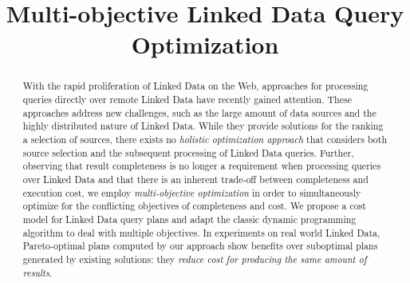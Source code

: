 \documentclass{sig-alternate}
\title{Multi-objective Linked Data Query Optimization}
\author{
}
\begin{document}
\maketitle
\begin{abstract} 
  With the rapid proliferation of Linked Data on the Web, approaches
  for processing queries directly over remote Linked Data have
  recently gained attention. These approaches address new challenges,
  such as the large amount of data sources and the highly distributed
  nature of Linked Data. While they provide solutions for the ranking
  a selection of sources, there exists no \emph{holistic optimization
    approach} that considers both source selection and the subsequent
  processing of Linked Data queries. Further, observing that result
  completeness is no longer a requirement when processing queries over
  Linked Data and that there is an inherent trade-off between
  completeness and execution cost, we employ \emph{multi-objective
    optimization} in order to simultaneously optimize for the
  conflicting objectives of completeness and cost. We
  propose a cost model for Linked Data query plans and adapt the
  classic dynamic programming algorithm to deal with multiple
  objectives. In experiments on real world Linked Data, Pareto-optimal
  plans computed by our approach show benefits over suboptimal
  plans generated by existing solutions: they 
  \emph{reduce cost for producing the same amount of results}.

\end{abstract}





%







%
\end{document}
